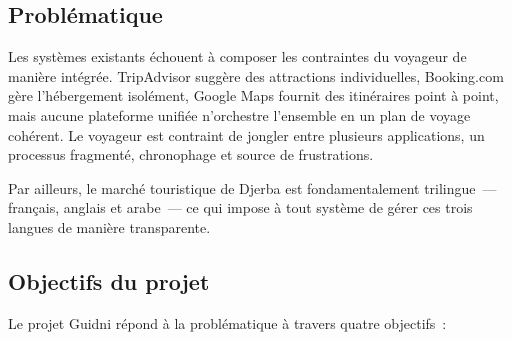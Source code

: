 \subsection{Problématique}

Les systèmes existants échouent à composer les contraintes du voyageur de manière intégrée.
TripAdvisor suggère des attractions individuelles, Booking.com gère l'hébergement isolément,
Google Maps fournit des itinéraires point à point, mais aucune plateforme unifiée n'orchestre
l'ensemble en un plan de voyage cohérent. Le voyageur est contraint de jongler entre plusieurs
applications, un processus fragmenté, chronophage et source de frustrations.

Par ailleurs, le marché touristique de Djerba est fondamentalement trilingue~--- français,
anglais et arabe~--- ce qui impose à tout système de gérer ces trois langues de manière
transparente.

\vspace{0.5cm}
\noindent
{}
\vspace{0.5cm}

\subsection{Objectifs du projet}

Le projet Guidni répond à la problématique à travers quatre objectifs~:


